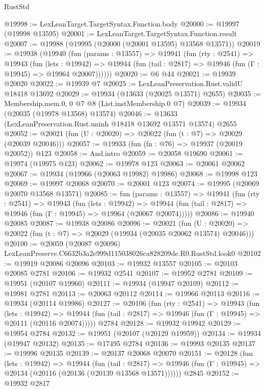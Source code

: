 \begin{lexlean}{RustStd}
\begin{coremodule}
@19998 := LexLeanTarget.TargetSyntax.Function.body
@20000 := @19997 (@19998 @13595)
@20001 := LexLeanTarget.TargetSyntax.Function.result
@20007 := @19988 (@19995 (@20000 (@20001 @13595) @13568 @13571))
@20019 := @19938
    (@19940
      (fun (params : @13557) =>
      @19941
        (fun (rty : @2541) =>
        @19943
          (fun (lets : @19942) =>
          @19944 (fun (tail : @2817) => @19946 (fun (Γ : @19945) => @19964 @20007))))))
@20020 := @6 @44
@20021 := @19939 @20020
@20022 := @19939 @7
@20025 := LexLeanPreservation.Rust.validU @18418 @13692
@20029 := @19934 (@13633 (@20025 @13571) @2655)
@20035 := Membership.mem.{0, 0} @7 @8 (List.instMembership.{0} @7)
@20039 := @19934 (@20035 (@19978 @13568) @13574)
@20046 := @13633 (LexLeanPreservation.Rust.uninh @18418 @13692 @13571 @13574) @2655
@20052 := @20021 (fun (U : @20020) => @20022 (fun (t : @7) => @20029 (@20039 @20046)))
@20057 := @19933 (fun (fn : @76) => @19937 (@20019 @20052)) @123
@20058 := And.intro
@20059 := @20058 @19690
@20061 := @19974 (@19975 @123)
@20062 := @19978 @123
@20063 := @20061 @20062
@20067 := @19934 (@19966 (@20063 @19982) @19986)
@20068 := @19998 @123
@20069 := @19997 @20068
@20070 := @20001 @123
@20074 := @19995 (@20069 @20070 @13568 @13571)
@20085 := fun (params : @13557) =>
  @19941
    (fun (rty : @2541) =>
    @19943
      (fun (lets : @19942) =>
      @19944 (fun (tail : @2817) => @19946 (fun (Γ : @19945) => @19964 (@20067 @20074)))))
@20086 := @19940 @20085
@20087 := @19938 @20086
@20096 := @20021
    (fun (U : @20020) => @20022 (fun (t : @7) => @20029 (@19934 (@20035 @20062 @13574) @20046)))
@20100 := @20059 (@20087 @20096) LexLeanPreserve.C6632b3a2e999d115038026ca828209de.R0.RustStd.look0
@20102 := @19919 @20086 @20096
@20103 := @19932 @13557
@20105 := @20103 @20085 @2781
@20106 := @19932 @2541
@20107 := @19952 @2781
@20109 := @19951 (@20107 @19960)
@20111 := @19934 (@19947 @20109)
@20112 := @19981 @2781
@20113 := @20063 @20112
@20114 := @19966 @20113
@20116 := @19934 (@20114 @19986)
@20127 := @20106
    (fun (rty : @2541) =>
    @19943
      (fun (lets : @19942) =>
      @19944 (fun (tail : @2817) => @19946 (fun (Γ : @19945) => @20111 (@20116 @20074)))))
    @2784
@20128 := @19932 @19942
@20129 := @19954 @2784
@20132 := @19951 (@20107 (@20129 @19959))
@20134 := @19934 (@19947 @20132)
@20135 := @17495 @2784
@20136 := @19993 @20135
@20137 := @19996 @20135
@20139 := @20137 @20068 @20070
@20151 := @20128
    (fun (lets : @19942) =>
    @19944
      (fun (tail : @2817) =>
      @19946 (fun (Γ : @19945) => @20134 (@20116 (@20136 (@20139 @13568 @13571))))))
    @2845
@20152 := @19932 @2817

\end{coremodule}
\end{lexlean}
